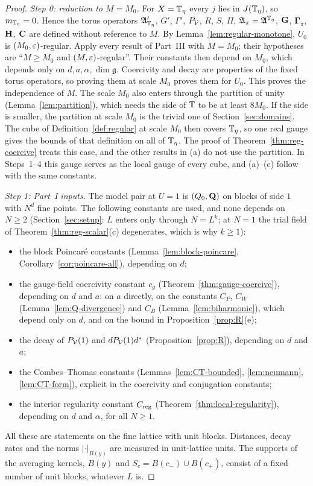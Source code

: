 \begin{proof}
\emph{Step 0: reduction to $M=M_0$.} For $X=\mathbb T_\eta$ every $j$ lies in $J(\mathbb T_\eta)$, so $m_{\mathbb T_\eta}=0$. Hence the torus operators $\mathfrak A'_{\mathbb T_\eta}$, $G'$, $\Gamma'$, $P_\mathcal V$, $R$, $S$, $\Pi$, $\mathfrak A_\pi=\mathfrak A^{\mathbb T_\eta}$, $\mathbf G$, $\boldsymbol\Gamma_\pi$, $\mathbf H$, $\mathbf C$ are defined without reference to $M$. By Lemma~\ref{lem:regular-monotone}, $U_0$ is $(M_0,\varepsilon)$-regular. Apply every result of Part~III with $M=M_0$; their hypotheses are ``$M\ge M_0$ and $(M,\varepsilon)$-regular''. Their constants then depend on $M_0$, which depends only on $d,a,\alpha,\dim\mathfrak g$. Coercivity and decay are properties of the fixed torus operators, so proving them at scale $M_0$ proves them for $U_0$. This proves the independence of $M$. The scale $M_0$ also enters through the partition of unity (Lemma~\ref{lem:partition}), which needs the side of $\mathbb T$ to be at least $8M_0$. If the side is smaller, the partition at scale $M_0$ is the trivial one of Section~\ref{sec:domains}. The cube of Definition~\ref{def:regular} at scale $M_0$ then covers $\mathbb T_\eta$, so one real gauge gives the bounds of that definition on all of $\mathbb T_\eta$. The proof of Theorem~\ref{thm:reg-coercive} treats this case, and the other results in (a) do not use the partition. In Steps~1--4 this gauge serves as the local gauge of every cube, and (a)--(c) follow with the same constants.

\emph{Step 1: Part~I inputs.} The model pair at $U=1$ is $(Q_0,\mathbf Q)$ on blocks of side $1$ with $N^d$ fine points. The following constants are used, and none depends on $N\ge2$ (Section~\ref{sec:setup}: $L$ enters only through $N=L^k$; at $N=1$ the trial field of Theorem~\ref{thm:reg-scalar}(c) degenerates, which is why $k\ge1$):
\begin{itemize}
\item the block Poincar\'e constants (Lemma~\ref{lem:block-poincare}, Corollary~\ref{cor:poincare-all}), depending on $d$;
\item the gauge-field coercivity constant $c_g$ (Theorem~\ref{thm:gauge-coercive}), depending on $d$ and $a$: on $a$ directly, on the constants $C_P$, $C_W$ (Lemma~\ref{lem:Q-divergence}) and $C_B$ (Lemma~\ref{lem:biharmonic}), which depend only on $d$, and on the bound in Proposition~\ref{prop:R}(e);
\item the decay of $P_\mathcal V(1)$ and $dP_\mathcal V(1)d^*$ (Proposition~\ref{prop:R}), depending on $d$ and $a$;
\item the Combes--Thomas constants (Lemmas~\ref{lem:CT-bounded}, \ref{lem:neumann}, \ref{lem:CT-form}), explicit in the coercivity and conjugation constants;
\item the interior regularity constant $C_{\rm reg}$ (Theorem~\ref{thm:local-regularity}), depending on $d$ and $\alpha$, for all $N\ge1$.
\end{itemize}
All these are statements on the fine lattice with unit blocks. Distances, decay rates and the norms $|\cdot|_{B(y)}$ are measured in unit-lattice units. The supports of the averaging kernels, $B(y)$ and $S_c=B(c_-)\cup B(c_+)$, consist of a fixed number of unit blocks, whatever $L$ is.


\end{proof}
